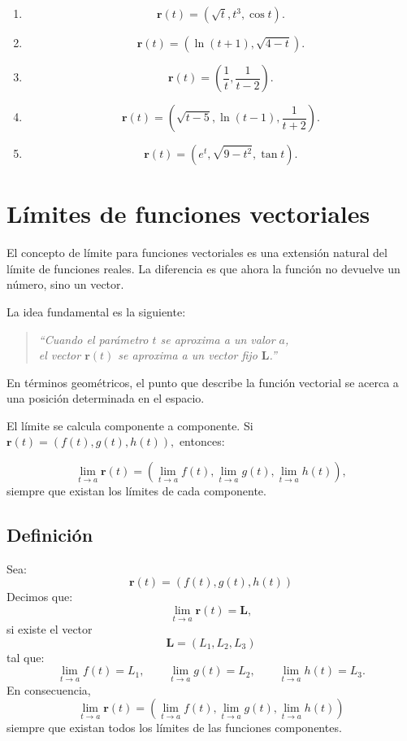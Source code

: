 \begin{enumerate}
    \item
    \[
    \mathbf{r}(t)=
    \left(
    \sqrt{t},
    t^3,
    \cos t
    \right).
    \]

    \item
    \[
    \mathbf{r}(t)=
    \left(
    \ln(t+1),
    \sqrt{4-t}
    \right).
    \]

    \item
    \[
    \mathbf{r}(t)=
    \left(
    \frac1{t},
    \frac1{t-2}
    \right).
    \]

    \item
    \[
    \mathbf{r}(t)=
    \left(
    \sqrt{t-5},
    \ln(t-1),
    \frac1{t+2}
    \right).
    \]

    \item
    \[
    \mathbf{r}(t)=
    \left(
    e^t,
    \sqrt{9-t^2},
    \tan t
    \right).
    \]
\end{enumerate}


\newpage
\section{Límites de funciones vectoriales}

El concepto de límite para funciones vectoriales es una extensión natural del límite de funciones reales. La diferencia es que ahora la función no devuelve un número, sino un vector.

La idea fundamental es la siguiente:

\begin{quote}
\centering
\textit{
``Cuando el parámetro $t$ se aproxima a un valor $a$, \\
el vector $\mathbf{r}(t)$ se aproxima a un vector fijo $\mathbf{L}$.''
}
\end{quote}

En términos geométricos, el punto que describe la función vectorial se acerca a una posición determinada en el espacio.

El límite se calcula componente a componente. Si $\mathbf{r}(t)=\left(f(t),g(t),h(t)\right),$ entonces:

\[
\lim_{t\to a}\mathbf{r}(t)
=
\left(
\lim_{t\to a}f(t),
\lim_{t\to a}g(t),
\lim_{t\to a}h(t)
\right),
\]
siempre que existan los límites de cada componente.

\subsection{Definición}
\begin{definicion}
Sea:
\[\mathbf{r}(t)=\left(f(t),g(t),h(t)\right)\]
Decimos que:
\[\lim_{t\to a}\mathbf{r}(t)=\mathbf{L},\]
si existe el vector
\[\mathbf{L}=(L_1,L_2,L_3)\]
tal que:
\[
\lim_{t\to a}f(t)=L_1,\qquad
\lim_{t\to a}g(t)=L_2,\qquad
\lim_{t\to a}h(t)=L_3.
\]
En consecuencia,
\[
\boxed{
\lim_{t\to a}\mathbf{r}(t) =
\left(
\lim_{t\to a}f(t),
\lim_{t\to a}g(t),
\lim_{t\to a}h(t)
\right)
}
\]
siempre que existan todos los límites de las funciones componentes.
\end{definicion}

